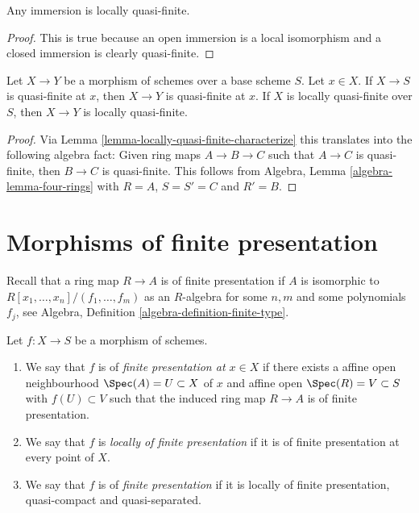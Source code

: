 \begin{lemma}
\label{lemma-immersion-locally-quasi-finite}
Any immersion is locally quasi-finite.
\end{lemma}

\begin{proof}
This is true because an open immersion is a local isomorphism
and a closed immersion is clearly quasi-finite.
\end{proof}

\begin{lemma}
\label{lemma-permanence-quasi-finite}
Let $X \to Y$ be a morphism of schemes over a base scheme $S$.
Let $x \in X$. If $X \to S$ is quasi-finite at $x$, then
$X \to Y$ is quasi-finite at $x$.
If $X$ is locally quasi-finite over $S$, then $X \to Y$
is locally quasi-finite.
\end{lemma}

\begin{proof}
Via Lemma \ref{lemma-locally-quasi-finite-characterize} this translates
into the following algebra
fact: Given ring maps $A \to B \to C$ such that $A \to C$ is
quasi-finite, then $B \to C$ is quasi-finite.
This follows from
Algebra, Lemma \ref{algebra-lemma-four-rings}
with $R = A$, $S = S' = C$ and $R' = B$.
\end{proof}















\section{Morphisms of finite presentation}
\label{section-finite-presentation}

\noindent
Recall that a ring map $R \to A$ is of finite presentation if
$A$ is isomorphic to $R[x_1, \ldots, x_n]/(f_1, \ldots, f_m)$ as
an $R$-algebra for some $n, m$ and some polynomials $f_j$, see
Algebra, Definition \ref{algebra-definition-finite-type}.

\begin{definition}
\label{definition-finite-presentation}
Let $f : X \to S$ be a morphism of schemes.
\begin{enumerate}
\item We say that $f$ is of {\it finite presentation at $x \in X$} if
there exists a affine open neighbourhood $\Spec(A) = U \subset X$
of $x$ and affine open $\Spec(R) = V \subset S$
with $f(U) \subset V$ such that the induced ring map
$R \to A$ is of finite presentation.
\item We say that $f$ is {\it locally of finite presentation} if it is
of finite presentation at every point of $X$.
\item We say that $f$ is of {\it finite presentation} if it is locally of
finite presentation, quasi-compact and quasi-separated.
\end{enumerate}
\end{definition}

